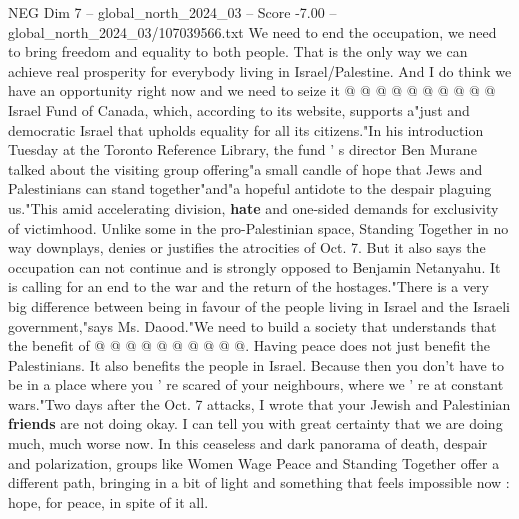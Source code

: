 \begin{textsample}{NEG Dim 7 – global\_north\_2024\_03 – Score -7.00 – global\_north\_2024\_03/107039566.txt}
We need to end the occupation, we need to bring freedom and equality to both people.
That is the only way we can achieve real prosperity for everybody living in Israel/Palestine.
And I do think we have an opportunity right now and we need to seize it @ @ @ @ @ @ @ @ @ @ Israel Fund of Canada, which, according to its website, supports a"just and democratic Israel that upholds equality for all its citizens."In his introduction Tuesday at the Toronto Reference Library, the fund ' s director Ben Murane talked about the visiting group offering"a small candle of hope that Jews and Palestinians can stand together"and"a hopeful antidote to the despair plaguing us."This amid accelerating division, \textbf{hate} and one-sided demands for exclusivity of victimhood.
Unlike some in the pro-Palestinian space, Standing Together in no way downplays, denies or justifies the atrocities of Oct. 7.
But it also says the occupation can not continue and is strongly opposed to Benjamin Netanyahu.
It is calling for an end to the war and the return of the hostages."There is a very big difference between being in favour of the people living in Israel and the Israeli government,"says Ms.
Daood."We need to build a society that understands that the benefit of @ @ @ @ @ @ @ @ @ @.
Having peace does not just benefit the Palestinians.
It also benefits the people in Israel.
Because then you don't have to be in a place where you ' re scared of your neighbours, where we ' re at constant wars."Two days after the Oct. 7 attacks, I wrote that your Jewish and Palestinian \textbf{friends} are not doing okay.
I can tell you with great certainty that we are doing much, much worse now.
In this ceaseless and dark panorama of death, despair and polarization, groups like Women Wage Peace and Standing Together offer a different path, bringing in a bit of light and something that feels impossible now : hope, for peace, in spite of it all.

\end{textsample}
